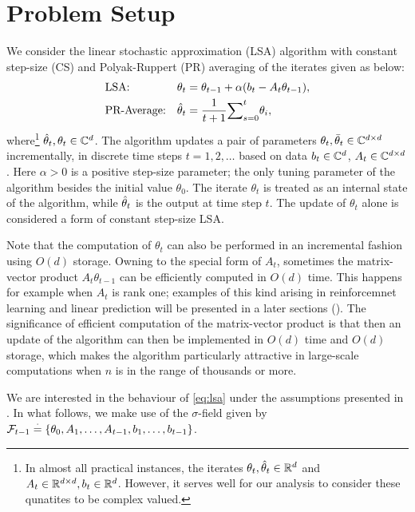 \section{Problem Setup}
We consider the linear stochastic approximation (LSA) algorithm with constant step-size (CS) and Polyak-Ruppert (PR) averaging of the iterates given as below:
\begin{subequations}\label{eq:lsa}
\begin{align}
\label{conststep}&\text{LSA:} &\theta_t&=\theta_{t-1}+\alpha(b_t-A_t\theta_{t-1}),\\
\label{iteravg}&\text{PR-Average:} &\hat{\theta}_t&=\frac{1}{t+1}{\sum}_{s=0}^{t}\theta_i,
\end{align}
\end{subequations}
where\footnote{In almost all practical instances, the iterates $\theta_t,\hat{\theta}_t\in \mathbb{R}^d$ and $A_t\in \mathbb{R}^{d \times d}, b_t\in \mathbb{R}^d$. However, it serves well for our analysis to consider these qunatites to be complex valued.} $\hat{\theta}_t, \theta_t \in \mathbb{C}^{d}$. The algorithm updates a pair of parameters $\theta_t,\bar{\theta}_t\in \mathbb{C}^{d \times d}$ incrementally, in discrete time steps $t=1,2,\dots$
based on data $b_t\in \mathbb{C}^d$, $A_t\in \mathbb{C}^{d \times d}$. Here $\alpha>0$ is a positive step-size parameter; the only tuning parameter of the algorithm besides the
initial value $\theta_0$. The iterate $\theta_t$ is treated as an internal state of the algorithm, while $\hat{\theta}_t$ is the output at time step $t$. The update of $\theta_t$ alone is considered a form of constant step-size LSA.\par
Note that the computation of $\theta_t$ can also be performed in an incremental fashion using $O(d)$ storage. Owning to the special form of $A_t$, sometimes the matrix-vector product $A_t \theta_{t-1}$ can be efficiently computed in $O(d)$ time. This happens for example when $A_t$ is rank one; examples of this kind arising in reinforcemnet learning \cite{sutton,konda-tsitsiklis,gtd,gtd2,gtdmp} and linear prediction \cite{bach,bachaistats} will be presented in a later sections (). The significance of efficient computation of the matrix-vector product is that then an update of the algorithm
can then be implemented in $O(d)$ time and $O(d)$ storage, which makes the algorithm particularly attractive in large-scale computations when $n$ is in the range of thousands or more.\par
We are interested in the behaviour of \eqref{eq:lsa} under the assumptions presented in . In what follows, we make use of the $\sigma$-field given by $\mathcal{F}_{t-1}\stackrel{\cdot}{=}\{\theta_0,A_1,\ldots, A_{t-1}, b_1,\ldots, b_{t-1}\}$.
